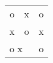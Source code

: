 \documentclass{article}
\begin{document}
\vspace*{\fill} \vspace*{-5ex}

\begin{tabular}{||c|cc|}
o & x & o\\\cline{2-3}
x & o & x\\
\multicolumn{2}{|||l|}{o  x }&o \\
\end{tabular}

\vspace*{\fill}
\end{document}
